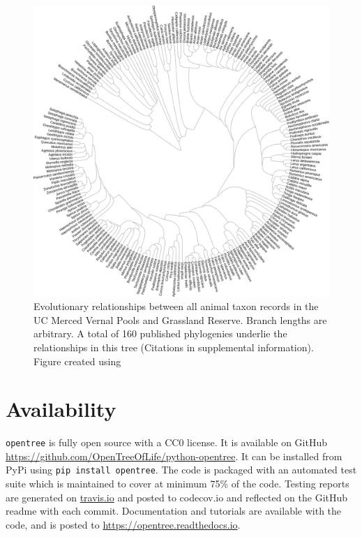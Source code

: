 \documentclass[oupdraft]{sysbio_sse}
\begin{document}
\begin{figure}[!p]
\centering\includegraphics[width=\textwidth]{vernal_animals}
\caption{Evolutionary relationships between all animal taxon records in the UC Merced Vernal Pools and Grassland Reserve. Branch lengths are arbitrary. A total of 160 published phylogenies underlie the relationships in this tree (Citations in supplemental information). Figure created using \citep{letunic_interactive_2019}}
\label{vernalanimals}
\end{figure}



\section{Availability}
\label{sec5}

\texttt{opentree} is fully open source with a CC0 license. It is available on GitHub \url{ https://github.com/OpenTreeOfLife/python-opentree}. It can be installed from PyPi using \texttt{pip install opentree}. The code is packaged with an automated test suite which is maintained to cover at minimum 75\% of the code. Testing reports are generated on \url{travis.io} and posted to {codecov.io} and reflected on the GitHub readme with each commit. Documentation and tutorials are available with the code, and is posted to \url{https://opentree.readthedocs.io}.
\end{document}
